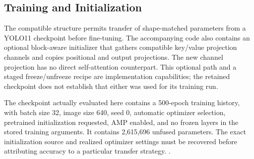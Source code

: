 \subsection{Training and Initialization}
The compatible structure permits transfer of shape-matched parameters from a
YOLO11 checkpoint before fine-tuning. The accompanying code also contains an
optional block-aware initializer that gathers compatible key/value projection
channels and copies positional and output projections. The new channel
projection has no direct self-attention counterpart. This optional path and a
staged freeze/unfreeze recipe are implementation capabilities; the retained
checkpoint does not establish that either was used for its training run.

The checkpoint actually evaluated here contains a 500-epoch training history,
with batch size 32, image size 640, seed 0, automatic optimizer selection,
pretrained initialization requested, AMP enabled, and no frozen layers in the
stored training arguments. It contains 2,615,696 unfused parameters. The exact
initialization source and realized optimizer settings must be recovered before
attributing accuracy to a particular transfer strategy.
.
